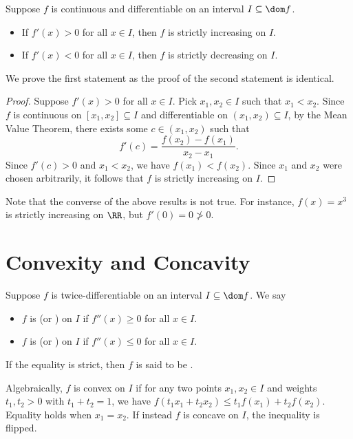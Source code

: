 \begin{proposition}
    Suppose $f$ is continuous and differentiable on an interval $I \subseteq \dom f$.
    \begin{itemize}
        \item If $f'(x) > 0$ for all $x \in I$, then $f$ is strictly increasing on $I$. 
        \item If $f'(x) < 0$ for all $x \in I$, then $f$ is strictly decreasing on $I$.
    \end{itemize}
\end{proposition}
We prove the first statement as the proof of the second statement is identical.
\begin{proof}
    Suppose $f'(x) > 0$ for all $x \in I$. Pick $x_1, x_2 \in I$ such that $x_1 < x_2$. Since $f$ is continuous on $[x_1, x_2] \subseteq I$ and differentiable on $(x_1, x_2) \subseteq I$, by the Mean Value Theorem, there exists some $c \in (x_1, x_2)$ such that \[f'(c) = \frac{f(x_2) - f(x_1)}{x_2 - x_1}.\] Since $f'(c) > 0$ and $x_1 < x_2$, we have $f(x_1) < f(x_2)$. Since $x_1$ and $x_2$ were chosen arbitrarily, it follows that $f$ is strictly increasing on $I$.
\end{proof}

Note that the converse of the above results is not true. For instance, $f(x) = x^3$ is strictly increasing on $\RR$, but $f'(0) = 0 \not> 0$.

\section{Convexity and Concavity}

\begin{definition}
    Suppose $f$ is twice-differentiable on an interval $I \subseteq \dom f$. We say
    \begin{itemize}
        \item $f$ is  (or ) on $I$ if $f''(x) \geq 0$ for all $x \in I$.
        \item $f$ is  (or ) on $I$ if $f''(x) \leq 0$ for all $x \in I$.
    \end{itemize}
\end{definition}

If the equality is strict, then $f$ is said to be .

Algebraically, $f$ is convex on $I$ if for any two points $x_1, x_2 \in I$ and weights $t_1, t_2 > 0$ with $t_1 + t_2 = 1$, we have $f(t_1x_1 + t_2 x_2) \leq t_1 f(x_1) + t_2 f(x_2)$. Equality holds when $x_1 = x_2$.  If instead $f$ is concave on $I$, the inequality is flipped.

